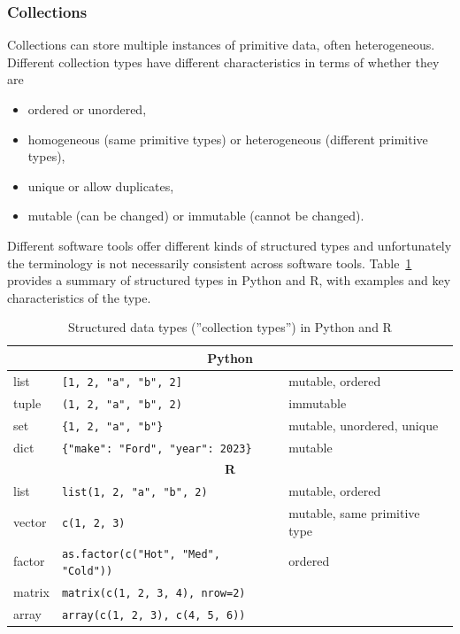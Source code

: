 \subsubsection*{Collections}

Collections can store multiple instances of primitive data, often heterogeneous. Different collection types have different characteristics in terms of whether they are 

\begin{itemize}
\item ordered or unordered, 
\item homogeneous (same primitive types) or heterogeneous (different primitive types), 
\item unique or allow duplicates, 
\item mutable (can be changed) or immutable (cannot be changed). 
\end{itemize}

Different software tools offer different kinds of structured types and unfortunately the terminology is not necessarily consistent across software tools. Table~\ref{tab:structured} provides a summary of structured types in Python and R, with examples and key characteristics of the type.

\begin{table}
\renewcommand{\arraystretch}{1.25}
\footnotesize
\centering

\begin{tabular}{l|l|l} \hline
\multicolumn{3}{c}{\textbf{Python}} \\ \hline
list & \texttt{[1, 2, "a", "b", 2]} & mutable, ordered \\
tuple & \texttt{(1, 2, "a", "b", 2)} & immutable \\
set & \texttt{\{1, 2, "a", "b"\}} &  mutable, unordered, unique \\
dict & \texttt{\{"make": "Ford", "year": 2023\}} & mutable \\ \hline
\multicolumn{3}{c}{\textbf{R}} \\ \hline 
list & \texttt{list(1, 2, "a", "b", 2)} & mutable, ordered \\
vector & \texttt{c(1, 2, 3)} & mutable, same primitive type \\
factor & \texttt{as.factor(c("Hot", "Med", "Cold"))} & ordered\\
matrix & \texttt{matrix(c(1, 2, 3, 4), nrow=2)} & \\
array & \texttt{array(c(1, 2, 3), c(4, 5, 6))} \\ \hline
\end{tabular}
\caption{Structured data types (''collection types'') in Python and R}
\label{tab:structured}
\end{table}

